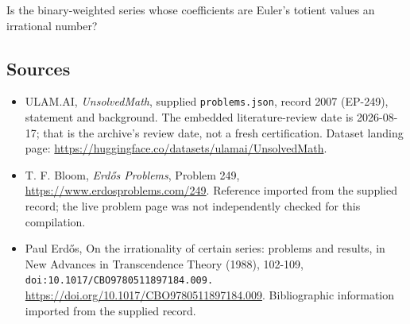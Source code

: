 \documentclass[11pt,a4paper]{article}
\begin{document}
Is the binary-weighted series whose coefficients are Euler's totient values an irrational number?

\subsection{Sources}

{\small

\begin{itemize}

\item[\hypertarget{source:2007:1}{S1}] ULAM.AI, \emph{UnsolvedMath}, supplied \texttt{problems.json}, record 2007 (EP-249), statement and background. The embedded literature-review date is 2026-08-17; that is the archive’s review date, not a fresh certification. Dataset landing page: \url{https://huggingface.co/datasets/ulamai/UnsolvedMath}.

\item[\hypertarget{source:2007:2}{S2}] T. F. Bloom, \emph{Erdős Problems}, Problem 249, \url{https://www.erdosproblems.com/249}. Reference imported from the supplied record; the live problem page was not independently checked for this compilation.

\item[\hypertarget{source:2007:3}{S3}] Paul Erdős, On the irrationality of certain series: problems and results, in New Advances in Transcendence Theory (1988), 102-109, \nolinkurl{doi:10.1017/CBO9780511897184.009.} \url{https://doi.org/10.1017/CBO9780511897184.009}. Bibliographic information imported from the supplied record.

\end{itemize}

}

\label{end:2007}
\end{document}
